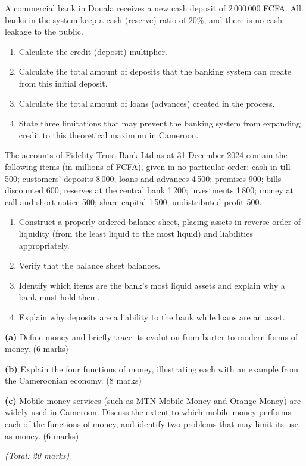 \documentclass[11pt]{article}
\newcounter{popsec}
\newcounter{popsub}
\newcommand{\courssub}[1]{%
  \stepcounter{popsub}%
  \par\vspace{9pt}\noindent{\popxbold\fontsize{11.5}{13}\selectfont\color{popink}{\color{poporange}\thepopsec.\thepopsub}\hspace{6pt}#1}\par\nopagebreak\vspace{4pt}
}
\begin{document}
\begin{exercice}
A commercial bank in Douala receives a new cash deposit of $2\,000\,000$ FCFA. All banks in the system keep a cash (reserve) ratio of 20\%, and there is no cash leakage to the public.
\begin{enumerate}
\item Calculate the credit (deposit) multiplier.
\item Calculate the total amount of deposits that the banking system can create from this initial deposit.
\item Calculate the total amount of loans (advances) created in the process.
\item State three limitations that may prevent the banking system from expanding credit to this theoretical maximum in Cameroon.
\end{enumerate}
\end{exercice}

\begin{exercice}
The accounts of Fidelity Trust Bank Ltd as at 31 December 2024 contain the following items (in millions of FCFA), given in no particular order: cash in till 500; customers' deposits 8\,000; loans and advances 4\,500; premises 900; bills discounted 600; reserves at the central bank 1\,200; investments 1\,800; money at call and short notice 500; share capital 1\,500; undistributed profit 500.
\begin{enumerate}
\item Construct a properly ordered balance sheet, placing assets in reverse order of liquidity (from the least liquid to the most liquid) and liabilities appropriately.
\item Verify that the balance sheet balances.
\item Identify which items are the bank's most liquid assets and explain why a bank must hold them.
\item Explain why deposits are a liability to the bank while loans are an asset.
\end{enumerate}
\end{exercice}

\courssub{I prepare for the GCE}

\begin{exercice}
\textbf{(a)} Define money and briefly trace its evolution from barter to modern forms of money. \hfill (6 marks)

\textbf{(b)} Explain the four functions of money, illustrating each with an example from the Cameroonian economy. \hfill (8 marks)

\textbf{(c)} Mobile money services (such as MTN Mobile Money and Orange Money) are widely used in Cameroon. Discuss the extent to which mobile money performs each of the functions of money, and identify two problems that may limit its use as money. \hfill (6 marks)

\hfill \emph{(Total: 20 marks)}
\end{exercice}
\end{document}
